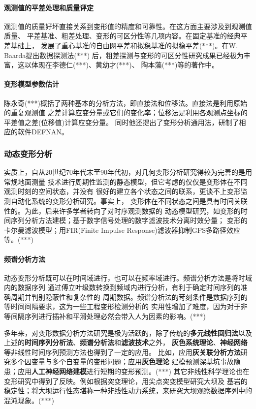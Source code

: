 \paragraph*{观测值的平差处理和质量评定}
观测值的质量好坏直接关系到变形值的精度和可靠性。在这方面主要涉及到观测值质量、
平差基准、粗差处理、变形的可区分性等几项内容。在固定基准的经典平差基础上，
发展了重心基准的自由网平差和拟稳基准的拟稳平差(***)。在W. Baarda提出数据探测法(***)
后，粗差探测与变形的可区分性研究成果已经极为丰富，这以体现在李德仁(***)、黄幼才(***)、
陶本藻(***)等的著作中。
\paragraph*{变形模型参数估计}
陈永奇(***)概括了两种基本的分析方法，即直接法和位移法。直接法是利用原始的重复观测值
之差计算应变分量或它们的变化率；位移法是利用各观测点坐标的平差值之差(位移值)计算应变分量。
同时他还提出了变形分析通用法，研制了相应的软件DEFNAN。

\subsubsection*{动态变形分析}
实质上，自从20世纪70年代末至90年代初，对几何变形分析研究得较为完善的是用常规地面测量
技术进行周期性监测的静态模型，但它考虑的仅仅是变形体在不同观测时刻的空间状态，并没有
很好的建立各个状态之间的联系，更谈不上变形监测自动化系统的变形分析研究。事实上，
变形体在不同状态之间是具有时间关联性的。为此，后来许多学者转向了对时序观测数据的
动态模型研究，如变形的时间序列分析方法建模；基于数字信号处理的数字滤波技术分离时效分量；
变形的卡尔曼滤波模型；用FIR(Finite Impulse Response)滤波器抑制GPS多路径效应等。(***)
\paragraph*{频谱分析方法}
动态变形分析既可以在时间域进行，也可以在频率域进行。频谱分析方法是将时域内的数据序列
通过傅立叶级数转换到频域内进行分析，有利于确定时间序列的准确周期并判别隐蔽性和复杂性的
周期数据。频谱分析法的苛刻条件是数据序列的等时间间隔要求，这为一些工程变形检测分析的
实用性增加了难度，因为对于非等间隔序列进行插补和平滑处理必然会带入人为因素的影响。(***)

多年来，对变形数据分析方法研究是极为活跃的，除了传统的\textbf{多元线性回归法}以及
上述的\textbf{时间序列分析法}、\textbf{频谱分析法}和\textbf{滤波技术}之外，
\textbf{灰色系统理论}、\textbf{神经网络}等非线性时间序列预测方法也得到了一定的应用。
比如，应用\textbf{灰关联分析方法}研究多个因变量与多个自变量的变形问题；应用\textbf{灰色理论}
建模预测深基坑事故隐患；应用\textbf{人工神经网络建模}进行短期的变形预测。(***)
其它非线性科学理论也在变形研究中得到了反映。例如根据突变理论，用尖点突变模型研究大坝及
基岩的稳定性；将大坝运行性态堪称一种非线性动力系统，来研究大坝观察数据序列中的混沌现象。(***)

